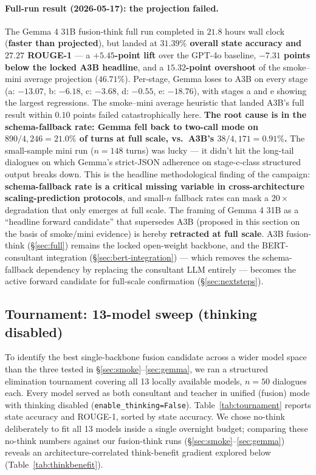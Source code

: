 \documentclass[11pt]{article}
\begin{document}
\paragraph{Full-run result (2026-05-17): the projection failed.} The Gemma 4 31B fusion-think full run completed in $21.8$ hours wall clock (\textbf{faster than projected}), but landed at \textbf{$31.39\%$ overall state accuracy and $27.27$ ROUGE-1} --- a \textbf{$+5.45$-point lift} over the GPT-4o baseline, \textbf{$-7.31$ points below the locked A3B headline}, and a \textbf{$15.32$-point overshoot} of the smoke--mini average projection ($46.71\%$). Per-stage, Gemma loses to A3B on every stage (a: $-13.07$, b: $-6.18$, c: $-3.68$, d: $-0.55$, e: $-18.76$), with stages a and e showing the largest regressions. The smoke--mini average heuristic that landed A3B's full result within $0.10$ points failed catastrophically here. \textbf{The root cause is in the schema-fallback rate: Gemma fell back to two-call mode on $890/4{,}246 = 21.0\%$ of turns at full scale, vs.\ A3B's $38/4{,}171 = 0.91\%$.} The small-sample mini run ($n{=}148$ turns) was lucky --- it didn't hit the long-tail dialogues on which Gemma's strict-JSON adherence on stage-c-class structured output breaks down. This is the headline methodological finding of the campaign: \textbf{schema-fallback rate is a critical missing variable in cross-architecture scaling-prediction protocols}, and small-$n$ fallback rates can mask a $20\times$ degradation that only emerges at full scale. The framing of Gemma 4 31B as a ``headline forward candidate'' that supersedes A3B (proposed in this section on the basis of smoke/mini evidence) is hereby \textbf{retracted at full scale}. A3B fusion-think (\S\ref{sec:full}) remains the locked open-weight backbone, and the BERT-consultant integration (\S\ref{sec:bert-integration}) --- which removes the schema-fallback dependency by replacing the consultant LLM entirely --- becomes the active forward candidate for full-scale confirmation (\S\ref{sec:nextsteps}).

\subsection{Tournament: 13-model sweep (thinking disabled)}
\label{sec:tournament}

To identify the best single-backbone fusion candidate across a wider model space than the three tested in \S\ref{sec:smoke}--\ref{sec:gemma}, we ran a structured elimination tournament covering all 13 locally available models, $n{=}50$ dialogues each. Every model served as both consultant and teacher in unified (fusion) mode with thinking disabled (\texttt{enable\_thinking=False}). Table~\ref{tab:tournament} reports state accuracy and ROUGE-1, sorted by state accuracy. We chose no-think deliberately to fit all 13 models inside a single overnight budget; comparing these no-think numbers against our fusion-think runs (\S\ref{sec:smoke}--\ref{sec:gemma}) reveals an architecture-correlated think-benefit gradient explored below (Table~\ref{tab:thinkbenefit}).
\end{document}
